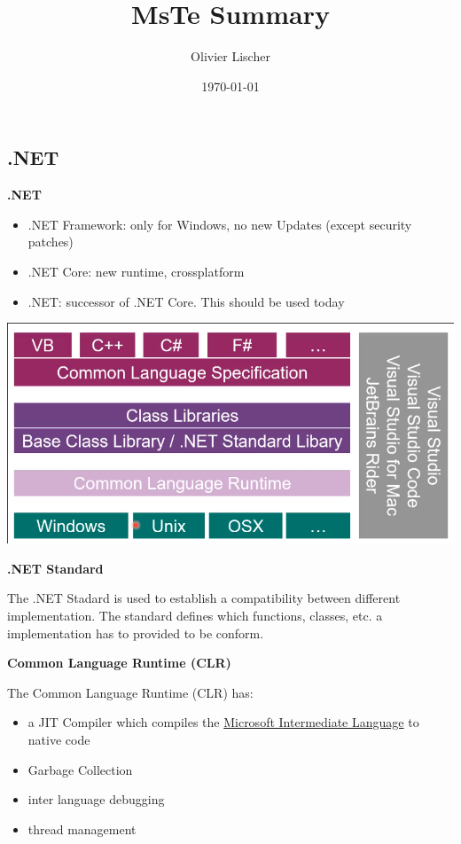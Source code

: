 \documentclass[11pt,twoside,landscape]{article}
\author{Olivier Lischer}
\date{\today}
\title{MsTe Summary}
\begin{document}
\pagestyle{fancy}
\fancyhf{}
\fancyfoot[CE,CO]{\leftmark}
\fancyfoot[R]{\thepage}
\begin{multicols}{3}

\section{.NET}
\label{sec:orgf8f6835}
\textbf{.NET}

\begin{itemize}
\item .NET Framework: only for Windows, no new Updates (except security patches)
\item .NET Core: new runtime, crossplatform
\item .NET: successor of .NET Core. This should be used today
\end{itemize}

\begin{center}
\includegraphics[width=.9\linewidth]{img/dot_net_architektur.png}
\label{org3754dcb}
\end{center}

\textbf{.NET Standard}

The .NET Stadard is used to establish a compatibility between different implementation.
The standard defines which functions, classes, etc. a implementation has to provided to be conform. 

\textbf{Common Language Runtime (CLR)}

The Common Language Runtime (CLR) has:
\begin{itemize}
\item a JIT Compiler which compiles the \href{../../../roam/20211003114528-microsoft_intermediate_language.org}{Microsoft Intermediate Language} to native code
\item Garbage Collection
\item inter language debugging
\item thread management
\end{itemize}



\end{multicols}
\end{document}
